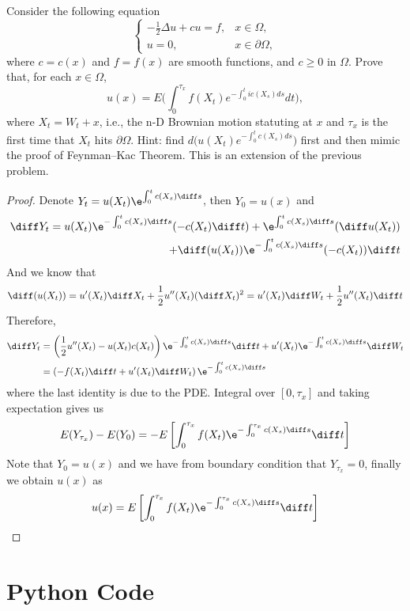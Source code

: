 \problem
\begin{question}
    Consider the following equation
    \begin{equation}
    \left\{
    \begin{array}{ll}
    -\frac{1}{2}\Delta u+cu=f,&x\in\Omega,\\
    u=0,&x\in\partial \Omega,
    \end{array}
    \right.
    \end{equation}
    where $c=c(x)$ and $f=f(x)$ are smooth functions, and $c\geq0$ in $\Omega$.  Prove that, for each $x\in \Omega$,
    \[u(x)=E\Big(\int_0^{\tau_x}f(X_t)e^{-\int_0^t ic(X_s) ds}dt\Big),\]
    where $X_t=W_t+x$, i.e., the n-D Brownian motion statuting at $x$ and $\tau_x$ is the first time that $X_t$ hits $\partial \Omega$.  Hint: find $d\big(u(X_t)e^{-\int_0^t c(X_s) ds} \big)$ first and then mimic the proof of Feynman--Kac Theorem.  This is an extension of the previous problem.
\end{question}
\begin{proof}
    Denote $Y_t=u(X_t)\e^{\int_0^tc(X_s)\diff s}$,
    then $Y_0=u(x)$ and
    \[\diff Y_t=
    \begin{aligned}[t]
    u(X_t)\e^{-\int_0^tc(X_s)\diff s}(-c(X_t)\diff t)
    +\e^{\int_0^tc(X_s)\diff s}(\diff u(X_t))\\
    +\diff(u(X_t))\e^{-\int_0^tc(X_s)\diff s}(-c(X_t))\diff t
    \end{aligned}\]
    And we know that
    \[\diff(u(X_t))=u'(X_t)\diff X_t+\frac{1}{2}u''(X_t)(\diff X_t)^2
    =u'(X_t)\diff W_t+\frac{1}{2}u''(X_t)\diff t\]
    Therefore,
    \[\begin{aligned}
        \diff Y_t&=
        \left(\frac{1}{2}u''(X_t)-u(X_t)c(X_t)\right)\e^{-\int_0^tc(X_s)\diff s}\diff t
        +u'(X_t)\e^{-\int_0^tc(X_s)\diff s}\diff W_t\\
        &=\left(-f(X_t)\diff t+u'(X_t)\diff W_t\right)\e^{-\int_0^tc(X_s)\diff s}
    \end{aligned}\]
    where the last identity is due to the PDE.
    Integral over $[0,\tau_x]$ and taking expectation gives us
    \[E(Y_{\tau_x})-E(Y_0)
    =-E\left[\int_0^{\tau_x}f(X_t)\e^{-\int_0^{\tau_x}c(X_s)\diff s}\diff t\right]\]
    Note that $Y_0=u(x)$ and we have from boundary condition that $Y_{\tau_x}=0$,
    finally we obtain $u(x)$ as
    \[u(x)=E\left[\int_0^{\tau_x}f(X_t)\e^{-\int_0^{\tau_x}c(X_s)\diff s}\diff t\right]\]
\end{proof}

\appendix
\section{Python Code}
